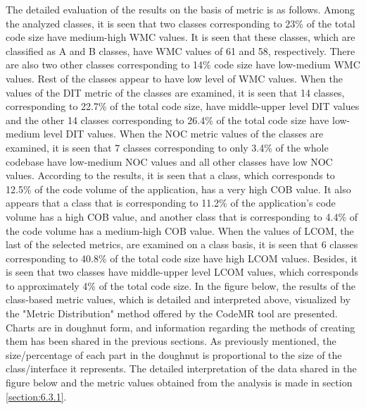 The detailed evaluation of the results on the basis of metric is as follows. Among the analyzed classes, it is seen that two classes corresponding to 23\% of the total code size have medium-high WMC values. It is seen that these classes, which are classified as A and B classes, have WMC values of 61 and 58, respectively. There are also two other classes corresponding to 14\% code size have low-medium WMC values. Rest of the classes appear to have low level of WMC values.  When the values of the DIT metric of the classes are examined, it is seen that 14 classes, corresponding to 22.7\% of the total code size, have middle-upper level DIT values and the other 14 classes corresponding to 26.4\% of the total code size have low-medium level DIT values. When the NOC metric values of the classes are examined, it is seen that 7 classes corresponding to only 3.4\% of the whole codebase have low-medium NOC values and all other classes have low NOC values. According to the results, it is seen that a class, which corresponds to 12.5\% of the code volume of the application, has a very high COB value. It also appears that a class that is corresponding to 11.2\% of the application's code volume has a high COB value, and another class that is corresponding to 4.4\% of the code volume has a medium-high COB value. When the values of LCOM, the last of the selected metrics, are examined on a class basis, it is seen that 6 classes corresponding to 40.8\% of the total code size have high LCOM values. Besides, it is seen that two classes have middle-upper level LCOM values, which corresponds to approximately 4\% of the total code size. In the figure below, the results of the class-based metric values, which is detailed and interpreted above, visualized by the "Metric Distribution" method offered by the CodeMR tool are presented. Charts are in doughnut form, and information regarding the methods of creating them has been shared in the previous sections. As previously mentioned,  the size/percentage of each part in the doughnut is proportional to the size of the class/interface it represents. The detailed interpretation of the data shared in the figure below and the metric values obtained from the analysis is made in section \ref{section:6.3.1}.

